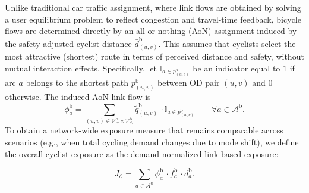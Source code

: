 \documentclass[lettersize,journal]{IEEEtran}
\begin{document}

Unlike traditional car traffic assignment, where link flows are obtained by solving a user equilibrium problem to reflect congestion and travel-time feedback, bicycle flows are determined directly by an all-or-nothing (AoN) assignment induced by the safety-adjusted cyclist distance $\bar d_{(u,v)}^{\mathrm b}$. This assumes that cyclists select the most attractive (shortest) route in terms of perceived distance and safety, without mutual interaction effects. Specifically, let $\mathbb I_{a\in p_{(u,v)}^{\mathrm b}}$ be an indicator equal to $1$ if arc $a$ belongs to the shortest path $p_{(u,v)}^{\mathrm b}$ between OD pair $(u,v)$ and $0$ otherwise. The induced AoN link flow is
\begin{equation}
\label{eq:flows_aon}
\phi_a^{\mathrm b}
=\sum_{(u,v)\in \mathcal V_{\mathcal O}^{\mathrm b}\times \mathcal V_{\mathcal D}^{\mathrm b}}
\tilde{q}_{(u,v)}^{\mathrm b}\, \cdot \mathbb I_{a\in p_{(u,v)}^{\mathrm b}}
\qquad \forall a\in \mathcal A^{\mathrm b}.
\end{equation}
To obtain a network-wide exposure measure that remains comparable across scenarios (e.g., when total cycling demand changes due to mode shift), we define the overall cyclist exposure as the demand-normalized link-based exposure:

\begin{equation}
\label{eq:overall_exposure_norm_flow}
J_{\mathcal{E}}
=\sum_{a\in \mathcal A^{\mathrm b}} \phi_a^{\mathrm b}\, \cdot f_a^{\mathrm b}\, \cdot d_a^{\mathrm b}.
\end{equation}





 
\end{document}

